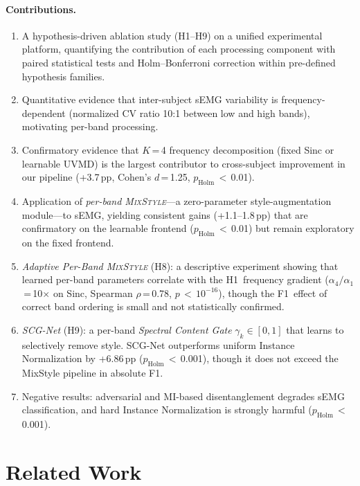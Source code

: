 \documentclass[conference]{IEEEtran}
\newcommand{\pp}{\,pp}
\newcommand{\mixstyle}{\textsc{MixStyle}}
\newcommand{\uvmd}{\textsc{UVMD}}
\begin{document}
\paragraph{Contributions.}
\begin{enumerate}
    \item A hypothesis-driven ablation study (H1--H9) on a unified experimental platform, quantifying the contribution of each processing component with paired statistical tests and Holm--Bonferroni correction within pre-defined hypothesis families.
    \item Quantitative evidence that inter-subject sEMG variability is frequency-dependent (normalized CV ratio 10:1 between low and high bands), motivating per-band processing.
    \item Confirmatory evidence that $K$\,=\,4 frequency decomposition (fixed Sinc or learnable \uvmd{}) is the largest contributor to cross-subject improvement in our pipeline (+3.7\pp{}, Cohen's $d$\,=\,1.25, $p_{\mathrm{Holm}}$\,$<$\,0.01).
    \item Application of \emph{per-band \mixstyle{}}---a zero-parameter style-augmentation module---to sEMG, yielding consistent gains (+1.1--1.8\pp{}) that are confirmatory on the learnable frontend ($p_{\mathrm{Holm}}$\,$<$\,0.01) but remain exploratory on the fixed frontend.
    \item \emph{Adaptive Per-Band \mixstyle{}} (H8): a descriptive experiment showing that learned per-band parameters correlate with the H1~frequency gradient ($\alpha_4/\alpha_1$\,=\,10$\times$ on Sinc, Spearman $\rho$\,=\,0.78, $p$\,$<$\,$10^{-16}$), though the F1~effect of correct band ordering is small and not statistically confirmed.
    \item \emph{SCG-Net} (H9): a per-band \emph{Spectral Content Gate} $\gamma_k \in [0,1]$ that learns to selectively remove style.  SCG-Net outperforms uniform Instance Normalization by +6.86\pp{} ($p_{\mathrm{Holm}}$\,$<$\,0.001), though it does not exceed the MixStyle pipeline in absolute F1.
    \item Negative results: adversarial and MI-based disentanglement degrades sEMG classification, and hard Instance Normalization is strongly harmful ($p_{\mathrm{Holm}}$\,$<$\,0.001).
\end{enumerate}

\section{Related Work}
\label{sec:related}
\end{document}
